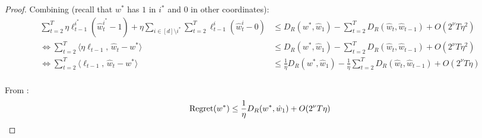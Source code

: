 \documentclass[10pt]{article}
\theoremstyle{definition}
\theoremstyle{remark}
\newcommand\inprod[2]{\langle #1,\,#2 \rangle}
\newcommand{\barconst}{\nu}
\newcommand{\reg}{{\rm Regret}}
\begin{document}
\begin{proof}
Combining  (recall that $w^*$ has $1$ in $i^*$ and $0$ in other coordinates):
\begin{align*}
\sum_{t=2}^T\eta\ell_{t-1}^{i^*}(\hat{w}_t^{i^*}-1) + \eta\sum_{i\in [d]\setminus i^*}\sum_{t=2}^T\ell_{t-1}^i(\hat{w}_t^i-0) &\le D_R(w^*,\hat{w}_1) - \sum_{t=2}^TD_R(\hat{w}_t,\hat{w}_{t-1})  + O(2^\barconst T\eta^2)\label{eq:in S}\\
    \Longleftrightarrow\sum_{t=2}^T\inprod{\eta\ell_{t-1}}{\hat{w}_t-w^*} &\le D_R(w^*,\hat{w}_1) - \sum_{t=2}^TD_R(\hat{w}_t,\hat{w}_{t-1})  + O(2^\barconst T\eta^2)\\
    \Longleftrightarrow\sum_{t=2}^T\inprod{\ell_{t-1}}{\hat{w}_t-w^*} &\le \frac{1}{\eta}D_R(w^*,\hat{w}_1) - \frac{1}{\eta}\sum_{t=2}^TD_R(\hat{w}_t,\hat{w}_{t-1})  + O(2^\barconst T\eta)\\
\end{align*}

From :
\begin{align*}
    \reg(w^*) \le \frac{1}{\eta}D_R(w^*,\hat{w}_1) + O(2^\barconst T\eta)
\end{align*}
\end{proof}
\end{document}
